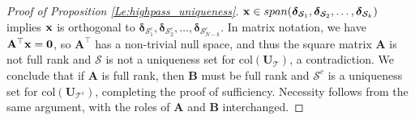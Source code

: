 \documentclass[journal, 10pt]{IEEEtran}
\begin{document}
{\begin{proof}[Proof of Proposition \ref{Le:highpass_uniqueness}]
${\bf x} \in \mbox{span}({\boldsymbol \delta}_{\mathcal{S}_{1}}, {\boldsymbol \delta}_{\mathcal{S}_{2}}, \ldots, {\boldsymbol \delta}_{\mathcal{S}_{k}})$ implies ${\bf x}$ is orthogonal to ${\boldsymbol \delta}_{\mathcal{S}^c_{1}}, {\boldsymbol \delta}_{\mathcal{S}^c_{2}}, \ldots, {\boldsymbol \delta}_{\mathcal{S}^c_{N-k}}.$
In matrix notation, we have $\mathbf{A}^{\top}{\bf x}={\bf 0}$, so $\mathbf{A}^{\top}$ has a non-trivial null space, and thus the square matrix $\mathbf{A}$ is not full rank and $\mathcal{S}$ is not a uniqueness set for $\mbox{col}({\mathbf{U}}_{\mathcal T})$, a contradiction. We conclude that if $\mathbf{A}$ is full rank, then $\mathbf{B}$ must be full rank and $\mathcal{S}^c$ is a uniqueness set for $\mbox{col}({\mathbf{U}}_{{\mathcal T}^c})$, completing the proof of sufficiency. Necessity follows from the same argument, with the roles of $\mathbf{A}$ and $\mathbf{B}$ interchanged.
\end{proof}
}


\balance

{}
\end{document}
